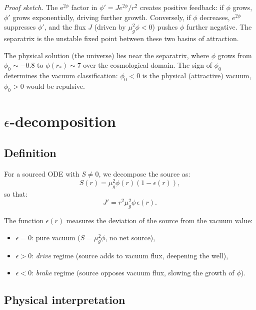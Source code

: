 \documentclass[11pt,letterpaper]{article}
\numberwithin{equation}{section}
\begin{document}
\textit{Proof sketch.}
The e$^{2\phi}$ factor in $\phi' = Je^{2\phi}/r^2$ creates positive
feedback: if $\phi$ grows, $\phi'$ grows exponentially, driving further
growth. Conversely, if $\phi$ decreases, $e^{2\phi}$ suppresses $\phi'$,
and the flux $J$ (driven by $\mu_g^2\phi < 0$) pushes $\phi$ further
negative. The separatrix is the unstable fixed point between these two
basins of attraction.

The physical solution (the universe) lies near the separatrix, where
$\phi$ grows from $\phi_0 \sim -0.8$ to $\phi(r_*) \sim 7$ over the
cosmological domain. The sign of $\phi_0$ determines the vacuum
classification: $\phi_0 < 0$ is the physical (attractive) vacuum,
$\phi_0 > 0$ would be repulsive.

\section{$\epsilon$-decomposition}
\label{sec:epsilon}

\subsection{Definition}

For a sourced ODE with $S \neq 0$, we decompose the source as:
\begin{equation}
\label{eq:epsilon_def}
  S(r) = \mu_g^2\phi(r)\left(1 - \epsilon(r)\right),
\end{equation}
so that:
\begin{equation}
  J' = r^2\mu_g^2\phi\,\epsilon(r).
\end{equation}

The function $\epsilon(r)$ measures the deviation of the source from the
vacuum value:
\begin{itemize}
  \item $\epsilon = 0$: pure vacuum ($S = \mu_g^2\phi$, no net source),
  \item $\epsilon > 0$: \emph{drive} regime (source adds to vacuum flux,
    deepening the well),
  \item $\epsilon < 0$: \emph{brake} regime (source opposes vacuum flux,
    slowing the growth of $\phi$).
\end{itemize}

\subsection{Physical interpretation}
\end{document}
